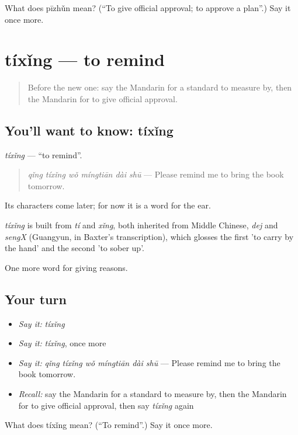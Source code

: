 \begin{tcolorbox}[breakable,colback=teal!4,colframe=teal!35!black,title={Before you move on}]
What does pīzhǔn mean? (\textquotedblleft{}To give official approval; to approve a plan\textquotedblright{}.) Say it once more.
\end{tcolorbox}
\section[tíxǐng]{tíxǐng — to remind}

\label{lesson:ZH-C364-tixing}



\begin{quote}
Before the new one: say the Mandarin for a standard to measure by, then the Mandarin for to give official approval.
\end{quote}

\subsection*{You'll want to know: tíxǐng}
\emph{tíxǐng} — \textquotedblleft{}to remind\textquotedblright{}.

\begin{quote}
\emph{qǐng tíxǐng wǒ míngtiān dài shū} — Please remind me to bring the book tomorrow.
\end{quote}

Its characters come later; for now it is a word for the ear.

\begin{cousinweb}
\emph{tíxǐng} is built from \emph{tí} and \emph{xǐng}, both inherited from Middle Chinese, \emph{dej} and \emph{sengX} (Guangyun, in Baxter's transcription), which glosses the first 'to carry by the hand' and the second 'to sober up'.
\end{cousinweb}

\begin{grammarlens}[title={What you've built}]
One more word for giving reasons.
\end{grammarlens}

\subsection*{Your turn}
\begin{itemize}
\raggedright
  \item \emph{Say it:} \emph{tíxǐng}
  \item \emph{Say it:} \emph{tíxǐng}, once more
  \item \emph{Say it:} \emph{qǐng tíxǐng wǒ míngtiān dài shū} — Please remind me to bring the book tomorrow.
  \item \emph{Recall:} say the Mandarin for a standard to measure by, then the Mandarin for to give official approval, then say \emph{tíxǐng} again
\end{itemize}

\begin{tcolorbox}[breakable,colback=teal!4,colframe=teal!35!black,title={Before you move on}]
What does tíxǐng mean? (\textquotedblleft{}To remind\textquotedblright{}.) Say it once more.
\end{tcolorbox}
